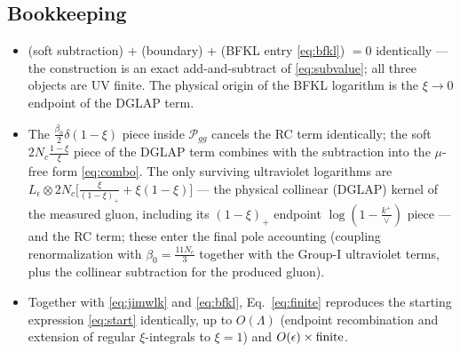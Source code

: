 \documentclass[10pt]{article}
\newcommand{\Leps}{L_{\epsilon}}
\begin{document}
\subsection*{Bookkeeping}
\begin{itemize}
\item[(i)] (soft subtraction) $+$ (boundary) $+$ (BFKL entry \eqref{eq:bfkl}) $=0$ identically ---
the construction is an exact add-and-subtract of \eqref{eq:subvalue}; all three objects are UV
finite. The physical origin of the BFKL logarithm is the $\xi\to0$ endpoint of the DGLAP term.
\item[(ii)] The $\frac{\beta_{0}}{2}\delta(1-\xi)$ piece inside $\mathcal P_{gg}$ cancels the RC term
identically; the soft $2N_{c}\frac{1-\xi}{\xi}$ piece of the DGLAP term combines with the
subtraction into the $\mu$-free form \eqref{eq:combo}. The only surviving ultraviolet logarithms
are $\Leps\otimes 2N_{c}\big[\frac{\xi}{(1-\xi)_{+}}+\xi(1-\xi)\big]$ --- the physical collinear
(DGLAP) kernel of the measured gluon, including its $(1-\xi)_{+}$ endpoint
$\log(1-\frac{k^{+}}{\vee})$ piece --- and the RC term; these enter the final pole accounting
(coupling renormalization with $\beta_{0}=\frac{11N_{c}}{3}$ together with the Group-I ultraviolet
terms, plus the collinear subtraction for the produced gluon).
\item[(iii)] Together with \eqref{eq:jimwlk} and \eqref{eq:bfkl}, Eq.~\eqref{eq:finite} reproduces
the starting expression \eqref{eq:start} identically, up to $O(\Lambda)$ (endpoint recombination
and extension of regular $\xi$-integrals to $\xi=1$) and $O(\epsilon)\times{\rm finite}$.
\end{itemize}
\end{document}
